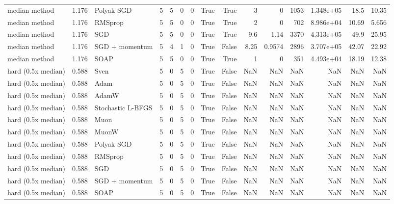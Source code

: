 \begin{tabular}{lrlrrrrrrrrrrrr}
median method & 1.176 & Polyak SGD & 5 & 5 & 0 & 0 & True & True & 3 & 0 & 1053 & 1.348e+05 & 18.5 & 10.35 \\
median method & 1.176 & RMSprop & 5 & 5 & 0 & 0 & True & True & 2 & 0 & 702 & 8.986e+04 & 10.69 & 5.656 \\
median method & 1.176 & SGD & 5 & 5 & 0 & 0 & True & True & 9.6 & 1.14 & 3370 & 4.313e+05 & 49.9 & 25.95 \\
median method & 1.176 & SGD + momentum & 5 & 4 & 1 & 0 & True & False & 8.25 & 0.9574 & 2896 & 3.707e+05 & 42.07 & 22.92 \\
median method & 1.176 & SOAP & 5 & 5 & 0 & 0 & True & True & 1 & 0 & 351 & 4.493e+04 & 18.19 & 12.38 \\
hard (0.5x median) & 0.588 & Sven & 5 & 0 & 5 & 0 & True & False & NaN & NaN & NaN & NaN & NaN & NaN \\
hard (0.5x median) & 0.588 & Adam & 5 & 0 & 5 & 0 & True & False & NaN & NaN & NaN & NaN & NaN & NaN \\
hard (0.5x median) & 0.588 & AdamW & 5 & 0 & 5 & 0 & True & False & NaN & NaN & NaN & NaN & NaN & NaN \\
hard (0.5x median) & 0.588 & Stochastic L-BFGS & 5 & 0 & 5 & 0 & True & False & NaN & NaN & NaN & NaN & NaN & NaN \\
hard (0.5x median) & 0.588 & Muon & 5 & 0 & 5 & 0 & True & False & NaN & NaN & NaN & NaN & NaN & NaN \\
hard (0.5x median) & 0.588 & MuonW & 5 & 0 & 5 & 0 & True & False & NaN & NaN & NaN & NaN & NaN & NaN \\
hard (0.5x median) & 0.588 & Polyak SGD & 5 & 0 & 5 & 0 & True & False & NaN & NaN & NaN & NaN & NaN & NaN \\
hard (0.5x median) & 0.588 & RMSprop & 5 & 0 & 5 & 0 & True & False & NaN & NaN & NaN & NaN & NaN & NaN \\
hard (0.5x median) & 0.588 & SGD & 5 & 0 & 5 & 0 & True & False & NaN & NaN & NaN & NaN & NaN & NaN \\
hard (0.5x median) & 0.588 & SGD + momentum & 5 & 0 & 5 & 0 & True & False & NaN & NaN & NaN & NaN & NaN & NaN \\
hard (0.5x median) & 0.588 & SOAP & 5 & 0 & 5 & 0 & True & False & NaN & NaN & NaN & NaN & NaN & NaN \\
\bottomrule
\end{tabular}
